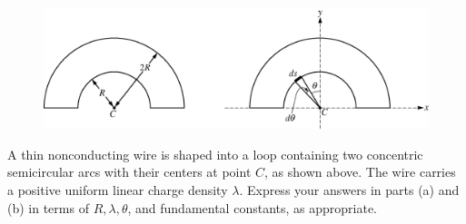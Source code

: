 %
\begin{figure}[H]
\centering
\includegraphics[scale=0.2]{images/img-020-045.png}
\end{figure}


\question
A thin nonconducting wire is shaped into a loop containing two concentric semicircular arcs with their centers at point $C$, as shown above. The wire carries a positive uniform linear charge density $\lambda$. Express your answers in parts (a) and (b) in terms of $R, \lambda, \theta$, and fundamental constants, as appropriate. %

